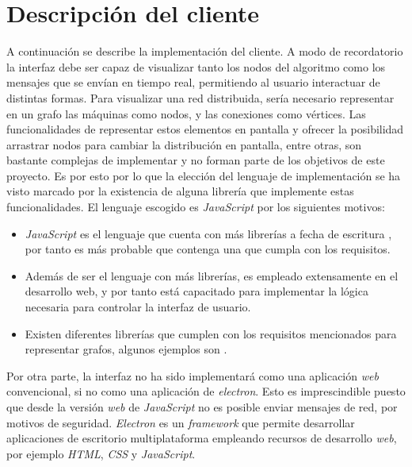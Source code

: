\section{Descripción del cliente}

A continuación se describe la implementación del cliente. A modo de recordatorio la interfaz debe ser capaz de visualizar tanto los nodos del algoritmo como los mensajes que se envían en tiempo real, permitiendo al usuario interactuar de distintas formas. Para visualizar una red distribuida, sería necesario representar en un grafo las máquinas como nodos, y las conexiones como vértices. Las funcionalidades de representar estos elementos en pantalla y ofrecer la posibilidad arrastrar nodos para cambiar la distribución en pantalla, entre otras, son bastante complejas de implementar y no forman parte de los objetivos de este proyecto. Es por esto por lo que la elección del lenguaje de implementación se ha visto marcado por la existencia de alguna librería que implemente estas funcionalidades. El lenguaje escogido es \textit{JavaScript} por los siguientes motivos:

\begin{itemize}
\item \textit{JavaScript}\cite{js} es el lenguaje que cuenta con más librerías a fecha de escritura \cite{libraries}, por tanto es más probable que contenga una que cumpla con los requisitos.

\item Además de ser el lenguaje con más librerías, es empleado extensamente en el desarrollo web, y por tanto está capacitado para implementar la lógica necesaria para controlar la interfaz de usuario.

\item Existen diferentes librerías que cumplen con los requisitos mencionados para representar grafos, algunos ejemplos son \cite{visjs}\cite{gojs}\cite{10.1093/bioinformatics/btv557}.
\end{itemize}

Por otra parte, la interfaz no ha sido implementará como una aplicación \textit{web} convencional, si no como una aplicación de \textit{electron}. Esto es imprescindible puesto que desde la versión \textit{web} de \textit{JavaScript} no es posible enviar mensajes de red, por motivos de seguridad. \textit{Electron}\cite{electron} es un \textit{framework} que permite desarrollar aplicaciones de escritorio multiplataforma empleando recursos de desarrollo \textit{web}, por ejemplo \textit{HTML}, \textit{CSS} y \textit{JavaScript}.

